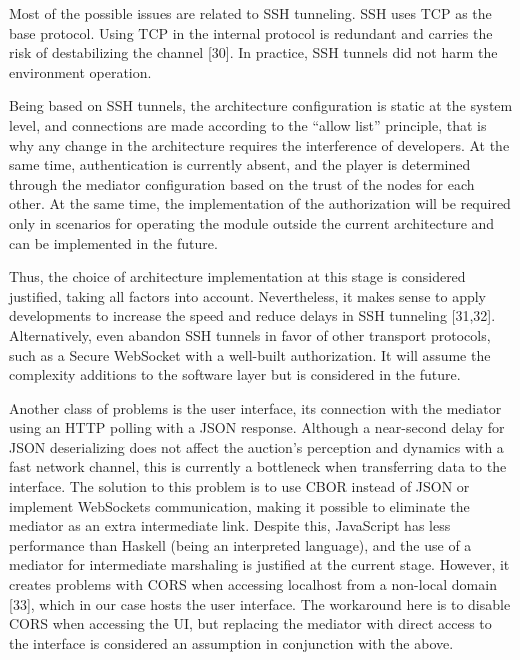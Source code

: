 \documentclass[
]{ceurart}
\begin{document}
Most of the possible issues are related to SSH tunneling. SSH uses TCP as the base protocol. Using TCP in the internal protocol is redundant and carries the risk of destabilizing the channel [30]. In practice, SSH tunnels did not harm the environment operation.

Being based on SSH tunnels, the architecture configuration is static at the system level, and connections are made according to the “allow list” principle, that is why any change in the architecture requires the interference of developers. At the same time, authentication is currently absent, and the player is determined through the mediator configuration based on the trust of the nodes for each other. At the same time, the implementation of the authorization will be required only in scenarios for operating the module outside the current architecture and can be implemented in the future.

Thus, the choice of architecture implementation at this stage is considered justified, taking all factors into account. Nevertheless, it makes sense to apply developments to increase the speed and reduce delays in SSH tunneling [31,32]. Alternatively, even abandon SSH tunnels in favor of other transport protocols, such as a Secure WebSocket with a well-built authorization. It will assume the complexity additions to the software layer but is considered in the future.

Another class of problems is the user interface, its connection with the mediator using an HTTP polling with a JSON response. Although a near-second delay for JSON deserializing does not affect the auction’s perception and dynamics with a fast network channel, this is currently a bottleneck when transferring data to the interface. The solution to this problem is to use CBOR instead of JSON or implement WebSockets communication, making it possible to eliminate the mediator as an extra intermediate link. Despite this, JavaScript has less performance than Haskell (being an interpreted language), and the use of a mediator for intermediate marshaling is justified at the current stage. However, it creates problems with CORS when accessing localhost from a non-local domain [33], which in our case hosts the user interface. The workaround here is to disable CORS when accessing the UI, but replacing the mediator with direct access to the interface is considered an assumption in conjunction with the above.
\end{document}
